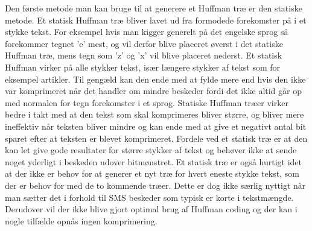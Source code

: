Den første metode man kan bruge til at generere et Huffman træ er den statiske metode. Et statisk Huffman træ bliver lavet ud fra formodede forekomster på i et stykke tekst. For eksempel hvis man kigger generelt på det engelske sprog så forekommer tegnet ’e’ mest, og vil derfor blive placeret øverst i det statiske Huffman træ, mens tegn som ’z’ og ’x’ vil blive placeret nederst\cite{Hufftree_2}.
Et statisk Huffman virker på alle stykker tekst, især længere stykker af tekst som for eksempel artikler. Til gengæld kan den ende med at fylde mere end hvis den ikke var komprimeret når det handler om mindre beskeder fordi det ikke altid går op med normalen for tegn forekomster i et sprog. Statiske Huffman træer virker bedre i takt med at den tekst som skal komprimeres bliver større, og bliver mere ineffektiv når teksten bliver mindre og kan ende med at give et negativt antal bit sparet efter at teksten er blevet komprimeret. \cite{Hufftree_3}
Fordele ved et statisk træ er at den kan let give gode resultater for større stykker af tekst og behøver ikke at sende noget yderligt i beskeden udover bitmønstret. Et statisk træ er også hurtigt idet at der ikke er behov for at generer et nyt træ for hvert eneste stykke tekst, som der er behov for med de to kommende træer. Dette er dog ikke særlig nyttigt når man sætter det i forhold til SMS beskeder som typisk er korte i tekstmængde. Derudover vil der ikke blive gjort optimal brug af Huffman coding og der kan i nogle tilfælde opnås ingen komprimering.